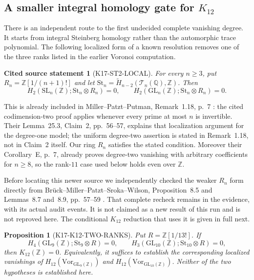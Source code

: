 \documentclass[11pt,a4paper]{article}
\newtheorem{proposition}[theorem]{Proposition}
\newtheorem{sourcefact}[theorem]{Cited source statement}
\theoremstyle{definition}
\begin{document}
\subsection{A smaller integral homology gate for \texorpdfstring{$K_{12}$}{K12}}

There is an independent route to the first undecided complete vanishing
degree. It starts from integral Steinberg homology rather than the
automorphic trace polynomial. The following localized form of a known
resolution removes one of the three ranks listed in the earlier
Voronoi computation.

\begin{sourcefact}[K17-ST2-LOCAL]\label{prop:steinberg-two-local}
For every $n\ge3$, put $R_n=\mathbb Z[1/(n+1)!]$ and let
$\mathrm{St}_n=\widetilde H_{n-2}(\mathcal T_n(\mathbb Q),\mathbb Z)$.
Then
\[
 H_2(\mathrm{SL}_n(\mathbb Z);\mathrm{St}_n\otimes R_n)=0,
 \qquad
 H_2(\mathrm{GL}_n(\mathbb Z);\mathrm{St}_n\otimes R_n)=0.
\]
\end{sourcefact}

This is already included in Miller--Patzt--Putman,
Remark~1.18, p.~7 \cite{MillerPatztPutman2025}: the cited
codimension-two proof applies whenever every prime at most $n$
is invertible. Their Lemma~25.3, Claim~2, pp.~56--57, explains
that localization argument for the degree-one model; the
uniform degree-two assertion is stated in Remark~1.18, not in
Claim~2 itself. Our ring $R_n$ satisfies the stated condition.
Moreover their Corollary~E, p.~7, already proves degree-two
vanishing with arbitrary coefficients for $n\ge8$, so the
rank-$11$ case used below holds even over $\mathbb Z$.

Before locating this newer source we independently checked the
weaker $R_n$ form directly from Br\"uck--Miller--Patzt--Sroka--Wilson,
Proposition~8.5 and Lemmas~8.7 and~8.9, pp.~57--59
\cite{BrueckEtAl2024}. That complete recheck remains in the
evidence, with its actual audit events. It is not claimed as a
new result of this run and is not reproved here. The conditional
$K_{12}$ reduction that uses it is given in full next.

\begin{proposition}[K17-K12-TWO-RANKS]\label{prop:k12-two-ranks}
Put $R=\mathbb Z[1/13!]$. If
\[
 H_4(\mathrm{GL}_9(\mathbb Z);\mathrm{St}_9\otimes R)=0,
 \qquad
 H_3(\mathrm{GL}_{10}(\mathbb Z);\mathrm{St}_{10}\otimes R)=0,
                                                               \tag{K23}
\]
then $K_{12}(\mathbb Z)=0$.
Equivalently, it suffices to establish the corresponding localized
vanishings of $H_{12}(\mathrm{Vor}_{\mathrm{GL}_9(\mathbb Z)})$
and $H_{12}(\mathrm{Vor}_{\mathrm{GL}_{10}(\mathbb Z)})$.
Neither of the two hypotheses is established here.
\end{proposition}
\end{document}

